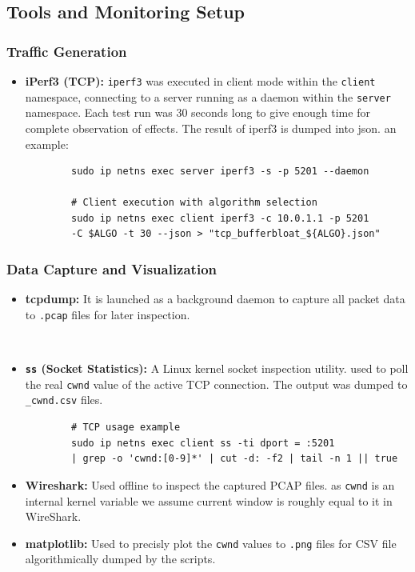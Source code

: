 \documentclass[12pt,a4paper]{article}
\begin{document}
\subsection{Tools and Monitoring Setup}

\subsubsection{Traffic Generation}
\begin{itemize}
    \item \textbf{iPerf3 (TCP):} \texttt{iperf3} was executed in client mode within the \texttt{client} namespace, connecting to a server running as a daemon within the \texttt{server} namespace. Each test run was 30 seconds long to give enough time for complete observation of effects. The result of iperf3 is dumped into json.  an example:
    \begin{verbatim}
        sudo ip netns exec server iperf3 -s -p 5201 --daemon
      
        # Client execution with algorithm selection
        sudo ip netns exec client iperf3 -c 10.0.1.1 -p 5201 
        -C $ALGO -t 30 --json > "tcp_bufferbloat_${ALGO}.json"
    \end{verbatim}

\end{itemize}

\subsubsection{Data Capture and Visualization}
\begin{itemize}
    \item \textbf{tcpdump:} It is launched as a background daemon to capture all packet data to  \texttt{.pcap} files for later  inspection.
    \begin{verbatim}
      
    \end{verbatim}
    \item \textbf{\texttt{ss} (Socket Statistics):} A Linux kernel socket inspection utility. used to poll the real \texttt{cwnd} value of the active TCP connection. The output was dumped to \texttt{\_cwnd.csv} files.
    \begin{verbatim}
        # TCP usage example
        sudo ip netns exec client ss -ti dport = :5201 
        | grep -o 'cwnd:[0-9]*' | cut -d: -f2 | tail -n 1 || true
    \end{verbatim}
    \item \textbf{Wireshark:} Used offline to inspect the captured PCAP files. as \texttt{cwnd} is an internal kernel variable we assume current window is roughly equal to it in WireShark.
    \item \textbf{matplotlib:} Used to precisly plot the \texttt{cwnd} values to \texttt{.png} files for CSV file algorithmically dumped by the scripts.
\end{itemize}
\end{document}
